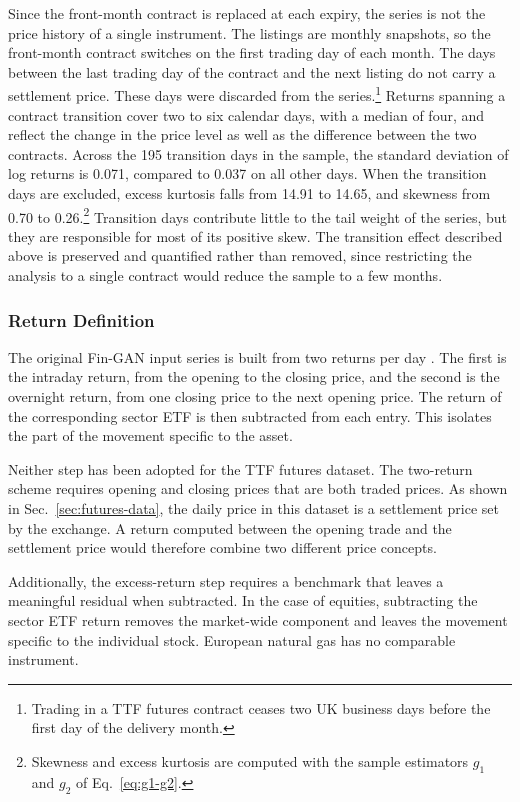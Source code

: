 Since the front-month contract is replaced at each expiry, the series is not the price history of a single instrument. The listings are monthly snapshots, so the front-month contract switches on the first trading day of each month. The days between the last trading day of the contract and the next listing do not carry a settlement price. These days were discarded from the series.\footnote{Trading in a TTF futures
contract ceases two UK business days before the first day of the delivery month.} Returns spanning a contract transition cover two to six calendar days, with a median of four, and reflect the change in the price level as well as the difference between the two contracts. Across the \num{195} transition days in the sample, the standard deviation of log returns is \num{0.071}, compared to \num{0.037} on all other days. When the transition days are excluded, excess kurtosis falls from \num{14.91} to \num{14.65}, and skewness from \num{0.70} to \num{0.26}.\footnote{Skewness and excess kurtosis are computed with the sample estimators $g_1$ and $g_2$ of Eq.~\eqref{eq:g1-g2}.} Transition days contribute little to the tail weight of the series, but they are responsible for most of its positive skew. The transition effect described above is preserved and quantified rather than removed, since restricting the analysis to a single contract would reduce the sample to a few months.

\subsubsection{Return Definition}\label{sec:return-definition}
The original Fin-GAN input series is built from two returns per day \parencite{vuleticFinGANForecastingClassifying2024}. The first is the intraday return, from the opening to the closing price, and the second is the overnight return, from one closing price to the next opening price. The return of the corresponding sector ETF is then subtracted from each entry. This isolates the part of the movement specific to the asset.

Neither step has been adopted for the TTF futures dataset. The two-return scheme requires opening and closing prices that are both traded prices. As shown in Sec.~\ref{sec:futures-data}, the daily price in this dataset is a settlement price set by the exchange. A return computed between the opening trade and the settlement price would therefore combine two different price concepts.

Additionally, the excess-return step requires a benchmark that leaves a meaningful residual when subtracted. In the case of equities, subtracting the sector ETF return removes the market-wide component and leaves the movement specific to the individual stock. European natural gas has no comparable instrument.

